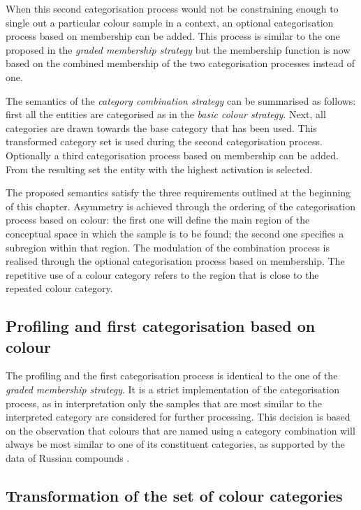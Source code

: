 When this second categorisation process would not be constraining
enough to single out a particular colour sample in a context, an
optional categorisation process based on membership can be added.
This process is similar to the one proposed in the \emph{graded
  membership strategy} but the membership function is now based on the
combined membership of the two categorisation processes instead of
one.

The semantics of the \emph{category combination strategy} can be
summarised as follows: first all the entities are categorised as in
the \emph{basic colour strategy}. Next, all categories are drawn
towards the base category that has been used. This transformed
category set is used during the second categorisation
process. Optionally a third categorisation process based on membership
can be added. From the resulting set the entity with the highest
activation is selected.

The proposed semantics satisfy the three requirements outlined at
the beginning of this chapter. Asymmetry is achieved through the
ordering of the categorisation process based on colour: the first one
will define the main region of the conceptual space in which the
sample is to be found; the second one specifies a subregion within
that region. The modulation of the combination process is realised
through the optional categorisation process based on membership. The
repetitive use of a colour category refers to the region that is close
to the repeated colour category.

\subsection{Profiling and first categorisation based on colour}

The profiling and the first categorisation process is identical to the
one of the \emph{graded membership strategy}. It is a strict
implementation of the categorisation process, as in interpretation
only the samples that are most similar to the interpreted category are
considered for further processing. This decision is based on the
observation that colours that are named using a category combination
will always be most similar to one of its constituent categories, as
supported by the data of Russian compounds \citep{safuanova07russian}.

\subsection{Transformation of the set of colour categories}

